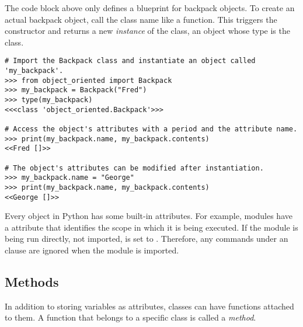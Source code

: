 The  code block above only defines a blueprint for backpack objects.
To create an actual backpack object, call the class name like a function.
This triggers the constructor and returns a new \emph{instance} of the class, an object whose type is the class.

\begin{lstlisting}
# Import the Backpack class and instantiate an object called 'my_backpack'.
>>> from object_oriented import Backpack
>>> my_backpack = Backpack("Fred")
>>> type(my_backpack)
<<<class 'object_oriented.Backpack'>>>

# Access the object's attributes with a period and the attribute name.
>>> print(my_backpack.name, my_backpack.contents)
<<Fred []>>

# The object's attributes can be modified after instantiation.
>>> my_backpack.name = "George"
>>> print(my_backpack.name, my_backpack.contents)
<<George []>>
\end{lstlisting}

\begin{info} %
Every object in Python has some built-in attributes.
For example, modules have a  attribute that identifies the scope in which it is being executed.
If the module is being run directly, not imported,  is set to .
Therefore, any commands under an  clause are ignored when the module is imported.
%
%
\end{info}

\subsection*{Methods} %

In addition to storing variables as attributes, classes can have functions attached to them.
A function that belongs to a specific class is called a \emph{method}.


